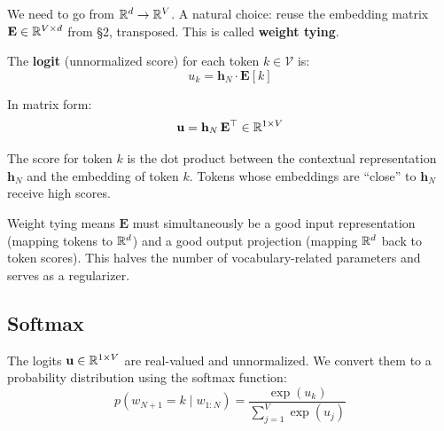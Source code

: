 \documentclass[main.tex]{subfiles}
\begin{document}
We need to go from $\mathbb{R}^d \to \mathbb{R}^V$. A natural choice: reuse the embedding matrix $\mathbf{E} \in \mathbb{R}^{V \times d}$ from \S2, transposed. This is called \textbf{weight tying}.

The \textbf{logit} (unnormalized score) for each token $k \in \mathcal{V}$ is:
$$u_k = \mathbf{h}_N \cdot \mathbf{E}[k]$$

In matrix form:
$$\mathbf{u} = \mathbf{h}_N \, \mathbf{E}^\top \in \mathbb{R}^{1 \times V}$$

The score for token $k$ is the dot product between the contextual representation $\mathbf{h}_N$ and the embedding of token $k$. Tokens whose embeddings are ``close'' to $\mathbf{h}_N$ receive high scores.

\begin{center}
\end{center}

\begin{remark}
Weight tying means $\mathbf{E}$ must simultaneously be a good input representation (mapping tokens to $\mathbb{R}^d$) and a good output projection (mapping $\mathbb{R}^d$ back to token scores). This halves the number of vocabulary-related parameters and serves as a regularizer.
\end{remark}

\subsection{Softmax}

The logits $\mathbf{u} \in \mathbb{R}^{1 \times V}$ are real-valued and unnormalized. We convert them to a probability distribution using the softmax function:
$$p(w_{N+1} = k \mid w_{1:N}) = \frac{\exp(u_k)}{\sum_{j=1}^{V} \exp(u_j)}$$
\end{document}
